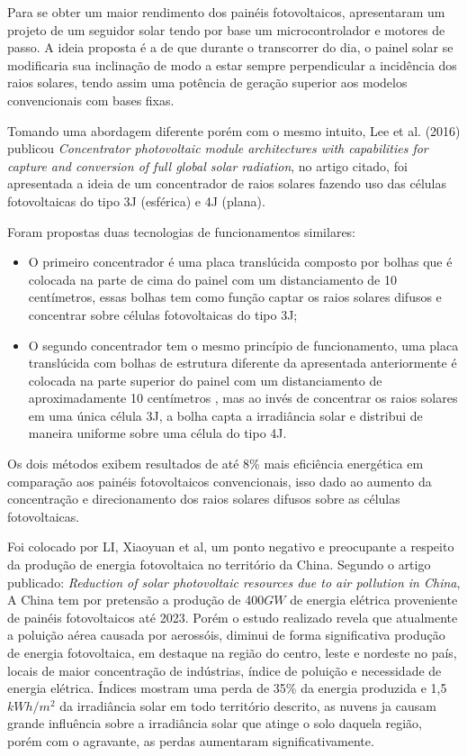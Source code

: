 Para se obter um maior rendimento dos painéis fotovoltaicos,  apresentaram um projeto de um seguidor solar tendo por base um microcontrolador e motores de passo. A ideia proposta é a de que durante o transcorrer do dia, o painel solar se modificaria sua inclinação de modo a estar sempre perpendicular a incidência dos raios solares, tendo assim uma potência de geração superior aos modelos convencionais com bases fixas.

Tomando uma abordagem diferente porém com o mesmo intuito, Lee et al. (2016) publicou \textit{Concentrator photovoltaic module architectures with capabilities for capture and conversion of full global solar radiation}, no artigo citado, foi apresentada a ideia de um concentrador de raios solares fazendo uso das células fotovoltaicas do tipo 3J (esférica) e 4J (plana). 

Foram propostas duas tecnologias de funcionamentos similares:

\begin{itemize}
	\item O primeiro concentrador é uma placa translúcida composto por bolhas que é colocada na parte de cima do painel com um distanciamento de 10 centímetros, essas bolhas tem como função captar os raios solares difusos e concentrar sobre células fotovoltaicas do tipo 3J;
	\item O segundo concentrador tem o mesmo princípio de funcionamento, uma placa translúcida com bolhas de estrutura diferente da apresentada anteriormente é colocada na parte superior do painel com um distanciamento de aproximadamente 10 centímetros , mas ao invés de concentrar os raios solares em uma única célula 3J, a bolha capta a irradiância solar e distribui de maneira uniforme sobre uma célula do tipo 4J.
\end{itemize}

Os dois métodos exibem resultados de até 8\% mais eficiência energética em comparação aos painéis fotovoltaicos convencionais, isso dado ao aumento da concentração e direcionamento dos raios solares difusos sobre as células fotovoltaicas.

Foi colocado por LI, Xiaoyuan et al, um ponto negativo e preocupante a respeito da produção de energia fotovoltaica no território da China. Segundo o artigo publicado: \textit{Reduction of solar photovoltaic resources due to air pollution in China}, A China tem por pretensão a produção de 400$GW$ de energia elétrica proveniente de painéis fotovoltaicos até 2023. Porém o estudo realizado revela que atualmente a poluição aérea causada por aerossóis, diminui de forma significativa produção de energia fotovoltaica, em destaque na região do centro, leste e nordeste no país, locais de maior concentração de indústrias, índice de poluição e necessidade de energia elétrica. Índices mostram uma perda de 35\% da energia produzida e 1,5$kWh/m^2$ da irradiância solar em todo território descrito, as nuvens ja causam grande influência sobre a irradiância solar que atinge o solo daquela região, porém com o agravante, as perdas aumentaram significativamente.

